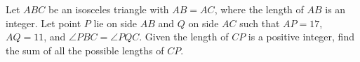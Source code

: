 Let $ABC$ be an isosceles triangle with $AB=AC$, where the length of $AB$ is an integer. Let point $P$ lie on side $AB$ and $Q$ on side $AC$ such that $AP=17$, $AQ=11$, and $\angle PBC=\angle PQC$. Given the length of $CP$ is a positive integer, find the sum of all the possible lengths of $CP$.
